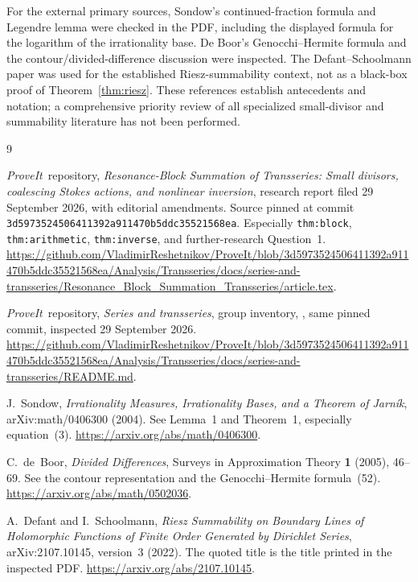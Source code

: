 \documentclass[11pt,a4paper]{article}
\numberwithin{equation}{section}
\theoremstyle{definition}
\theoremstyle{remark}
\newcommand{\repo}{\textit{ProveIt}}
\begin{document}
For the external primary sources, Sondow's continued-fraction formula
and Legendre lemma were checked in the PDF, including the displayed
formula for the logarithm of the irrationality base. De Boor's
Genocchi--Hermite formula and the contour/divided-difference discussion
were inspected. The Defant--Schoolmann paper was used for the established
Riesz-summability context, not as a black-box proof of
Theorem~\ref{thm:riesz}. These references establish antecedents and
notation; a comprehensive priority review of all specialized
small-divisor and summability literature has not been performed.

\begin{thebibliography}{9}

\repo\ repository,
\emph{Resonance-Block Summation of Transseries: Small divisors,
coalescing Stokes actions, and nonlinear inversion},
research report filed 29 September 2026, with editorial amendments.
Source pinned at commit \texttt{3d5973524506411392a911470b5ddc35521568ea}.
Especially \texttt{thm:block}, \texttt{thm:arithmetic},
\texttt{thm:inverse}, and further-research Question~1.
\url{https://github.com/VladimirReshetnikov/ProveIt/blob/3d5973524506411392a911470b5ddc35521568ea/Analysis/Transseries/docs/series-and-transseries/Resonance_Block_Summation_Transseries/article.tex}.

\repo\ repository,
\emph{Series and transseries}, group inventory,
,
same pinned commit, inspected 29 September 2026.
\url{https://github.com/VladimirReshetnikov/ProveIt/blob/3d5973524506411392a911470b5ddc35521568ea/Analysis/Transseries/docs/series-and-transseries/README.md}.

J.~Sondow,
\emph{Irrationality Measures, Irrationality Bases, and a Theorem of
Jarn\'ik}, arXiv:math/0406300 (2004).
See Lemma~1 and Theorem~1, especially equation~(3).
\url{https://arxiv.org/abs/math/0406300}.

C.~de~Boor,
\emph{Divided Differences},
Surveys in Approximation Theory \textbf{1} (2005), 46--69.
See the contour representation and the Genocchi--Hermite formula~(52).
\url{https://arxiv.org/abs/math/0502036}.

A.~Defant and I.~Schoolmann,
\emph{Riesz Summability on Boundary Lines of Holomorphic Functions of
Finite Order Generated by Dirichlet Series},
arXiv:2107.10145, version~3 (2022).
The quoted title is the title printed in the inspected PDF.
\url{https://arxiv.org/abs/2107.10145}.

\end{thebibliography}
\end{document}
